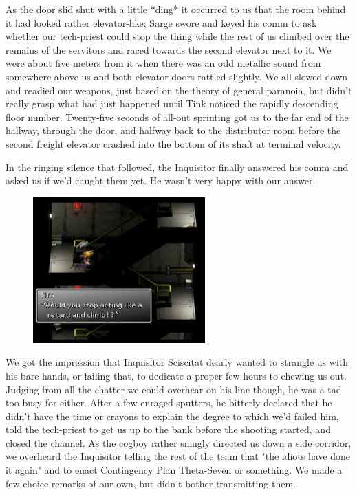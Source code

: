 As the door slid shut with a little *ding* it occurred to us that the room behind it had looked rather elevator-like; 
Sarge swore and keyed his comm to ask whether our tech-priest could stop the thing while the rest of us climbed over the remains of the servitors and raced towards the second elevator next to it. 
We were about five meters from it when there was an odd metallic sound from somewhere above us and both elevator doors rattled slightly. 
We all slowed down and readied our weapons, just based on the theory of general paranoia, but didn't really grasp what had just happened until Tink noticed the rapidly descending floor number. 
Twenty-five seconds of all-out sprinting got us to the far end of the hallway, through the door, and halfway back to the distributor room before the second freight elevator crashed into the bottom of its shaft at terminal velocity. 


In the ringing silence that followed, the Inquisitor finally answered his comm and asked us if we'd caught them yet. 
He wasn't very happy with our answer.

\begin{figure}
	\begin{center}
		\includegraphics[width=\figwidth]{pics/18/19.png}
	\end{center}
\end{figure}
We got the impression that Inquisitor Sciscitat dearly wanted to strangle us with his bare hands, or failing that, to dedicate a proper few hours to chewing us out. 
Judging from all the chatter we could overhear on his line though, he was a tad too busy for either. 
After a few enraged sputters, he bitterly declared that he didn't have the time or crayons to explain the degree to which we'd failed him, told the tech-priest to get us up to the bank before the shooting started, and closed the channel. 
As the cogboy rather smugly directed us down a side corridor, we overheard the Inquisitor telling the rest of the team that "the idiots have done it again" and to enact Contingency Plan Theta-Seven or something. 
We made a few choice remarks of our own, but didn't bother transmitting them.


